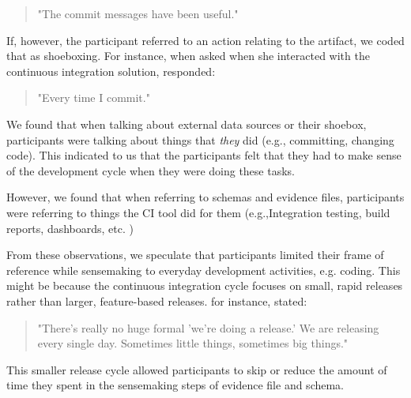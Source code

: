 \documentclass{sig-alternate}
\begin{document}
\begin{quote}
"The commit messages have been  useful."
\end{quote}


If, however, the participant referred to an action relating to the artifact, we coded that as shoeboxing. For instance, when asked when she interacted with the continuous integration solution, \srutitwo responded: 

\begin{quote}
"Every time I commit."	
\end{quote}

We found that when talking about external data sources  or their shoebox, participants were talking about things that \textit{they} did (e.g., committing, changing code). This indicated to us that the participants felt that they had to make sense of the development cycle when they were doing these tasks. 

However, we found that when referring to schemas and evidence files, participants were referring to things the CI tool did for them (e.g.,Integration testing, build reports, dashboards, etc.
) 

From these observations, we speculate that participants limited their frame of reference while sensemaking to everyday development activities, e.g. coding. This might be because the continuous integration cycle focuses on small, rapid releases rather than larger, feature-based releases. for instance, \cpg stated:

\begin{quote}
"There's really no huge formal 'we're doing a release.' We are releasing every single day. Sometimes little things, sometimes big things."	
\end{quote}


This smaller release cycle allowed participants to skip or reduce the amount of time they spent in the sensemaking steps of evidence file and schema. 
\end{document}
